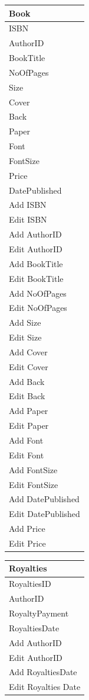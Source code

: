 \begin{tabular}{|p{4cm}|}
    \hline
    \textbf{Book} \\ \hline
    ISBN \\ AuthorID \\ BookTitle \\ NoOfPages \\ Size \\ Cover \\ Back \\ Paper \\ Font \\ FontSize \\ Price \\ DatePublished \\ \hline
    Add ISBN \\ Edit ISBN \\ Add AuthorID \\ Edit AuthorID \\ Add BookTitle \\ Edit BookTitle \\ Add NoOfPages \\ Edit NoOfPages \\ Add Size \\ Edit Size \\ Add Cover \\ Edit Cover \\ Add Back \\ Edit Back \\ Add Paper \\ Edit Paper \\ Add Font \\ Edit Font \\ Add FontSize \\ Edit FontSize \\ Add DatePublished \\ Edit DatePublished \\ Add Price \\ Edit Price \\ \hline
    \hline
\end{tabular}

\begin{tabular}{|p{4cm}|}
    \hline
    \textbf{Royalties} \\ \hline
    RoyaltiesID \\ AuthorID \\ RoyaltyPayment \\ RoyaltiesDate \\ \hline
    Add AuthorID \\ Edit AuthorID \\ Add RoyaltiesDate \\ Edit Royalties Date \\ \hline
\end{tabular}

